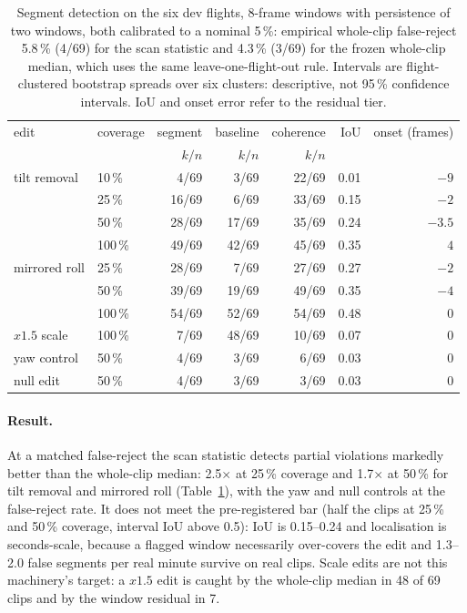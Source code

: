 \begin{table}[t]
\centering
\caption{Segment detection on the six dev flights, 8-frame windows with persistence of two
windows, both calibrated to a nominal 5\,\%: empirical whole-clip false-reject 5.8\,\% (4/69) for
the scan statistic and 4.3\,\% (3/69) for the frozen whole-clip median, which uses the same
leave-one-flight-out rule. Intervals
are flight-clustered bootstrap spreads over six clusters: descriptive, not 95\,\% confidence
intervals. IoU and onset error refer to the residual tier.}
\label{tab:g01-detection}
\begin{tabular}{llrrrrr}
\toprule
edit & coverage & segment & baseline & coherence & IoU & onset (frames) \\
 & & $k/n$ & $k/n$ & $k/n$ & & \\
\midrule
tilt removal & 10\,\% & 4/69 & 3/69 & 22/69 & 0.01 & $-9$ \\
             & 25\,\% & 16/69 & 6/69 & 33/69 & 0.15 & $-2$ \\
             & 50\,\% & 28/69 & 17/69 & 35/69 & 0.24 & $-3.5$ \\
             & 100\,\% & 49/69 & 42/69 & 45/69 & 0.35 & $4$ \\
\midrule
mirrored roll & 25\,\% & 28/69 & 7/69 & 27/69 & 0.27 & $-2$ \\
              & 50\,\% & 39/69 & 19/69 & 49/69 & 0.35 & $-4$ \\
              & 100\,\% & 54/69 & 52/69 & 54/69 & 0.48 & $0$ \\
\midrule
$x1.5$ scale & 100\,\% & 7/69 & 48/69 & 10/69 & 0.07 & $0$ \\
yaw control & 50\,\% & 4/69 & 3/69 & 6/69 & 0.03 & $0$ \\
null edit & 50\,\% & 4/69 & 3/69 & 3/69 & 0.03 & $0$ \\
\bottomrule
\end{tabular}
\end{table}

\paragraph{Result.} At a matched false-reject the scan statistic detects partial violations
markedly better than the whole-clip median: 2.5$\times$ at 25\,\% coverage and 1.7$\times$ at
50\,\% for tilt removal and mirrored roll (Table~\ref{tab:g01-detection}), with the yaw and null
controls at the false-reject rate. It does not meet the pre-registered bar (half the clips at
25\,\% and 50\,\% coverage, interval IoU above 0.5): IoU is 0.15--0.24 and localisation is
seconds-scale, because a flagged window necessarily over-covers the edit and 1.3--2.0 false
segments per real minute survive on real clips. Scale edits are not this machinery's target: a
$x1.5$ edit is caught by the whole-clip median in 48 of 69 clips and by the window residual in 7.

